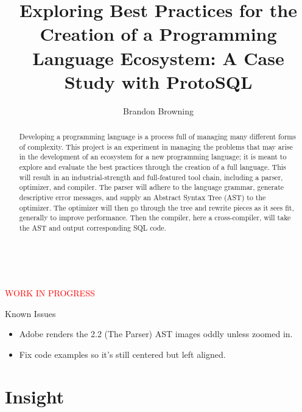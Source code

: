 \documentclass[titlepage]{article}
\begin{document}
	\thispagestyle{empty}
	\vspace*{\fill}
		~\centerline{\textcolor{red}{\Huge{WORK IN PROGRESS}}}
		\newline\newline

		\large{Known Issues}
		\begin{itemize}
			\item Adobe renders the 2.2 (The Parser) AST images oddly unless zoomed in.
			\item Fix code examples so it's still centered but left aligned.
		\end{itemize}

		\listoftodos
	\vspace*{\fill}

	\newpage

	\thispagestyle{empty}
	\title{Exploring Best Practices for the Creation of a Programming Language Ecosystem: A Case Study with ProtoSQL}
	\author{Brandon Browning}
	\maketitle

	\begin{abstract}
		Developing a programming language is a process full of managing many different forms of complexity.  This project is an experiment in managing the problems that may arise in the development of an ecosystem for a new programming language; it is meant to explore and evaluate the best practices through the creation of a full language.  This will result in an industrial-strength and full-featured tool chain, including a parser, optimizer, and compiler.  The parser will adhere to the language grammar, generate descriptive error messages, and supply an Abstract Syntax Tree (AST) to the optimizer.  The optimizer will then go through the tree and rewrite pieces as it sees fit, generally to improve performance.  Then the compiler, here a cross-compiler, will take the AST and output corresponding SQL code.

	\end{abstract}

	\newpage

	\thispagestyle{empty}
	\tableofcontents
	\listoffigures

	\newpage

	\setcounter{page}{1}

	\section{Insight}
\end{document}
